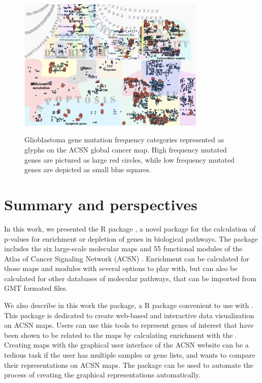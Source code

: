 \documentclass[article]{jss}
\begin{document}
\begin{figure}[!ht]
  \caption{Glioblastoma gene mutation frequency categories represented as
  glyphs on the ACSN global cancer map. High frequency mutated genes are
  pictured as large red circles, while low frequency mutated genes are depicted
  as small blue squares.
  } 
  \centering
  \includegraphics[width=0.8\textwidth]{figures/gbm.pdf}
  \label{fig:gbm}
\end{figure}

\section[Summary and perspectives]{Summary and perspectives}
In this work, we presented the R package , a novel package for
the calculation of p-values for enrichment or depletion of genes in biological
pathways. The package includes the six large-scale molecular maps and 55
functional modules of the Atlas of Cancer Signaling Network (ACSN) . Enrichment can be
calculated for those maps and modules with several options to play with, but can
also be calculated for other databases of molecular pathways, that can be
imported from GMT formated files. 

We also describe in this work the  package, a R package convenient to use with . This package is dedicated to create web-based
and interactive data visualization on ACSN maps. Users can use this tools to
represent genes of interest that have been shown to be related to the maps by
calculating enrichment with the  .  Creating maps with the
graphical user interface of the ACSN website can be a tedious task if the user
has multiple samples or gene lists, and wants to compare their representations
on ACSN maps. The  package can be used to automate the process of
creating the graphical representations automatically. 
\end{document}
